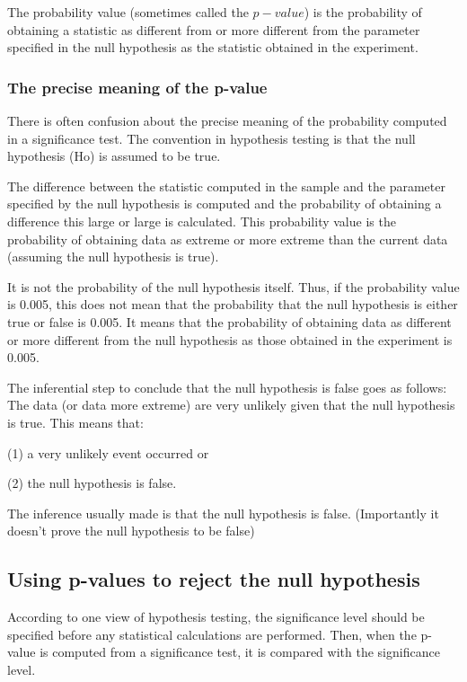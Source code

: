 \documentclass[a4paper,12pt]{article}
\begin{document}
The probability value (sometimes called the $p-value$) is the probability of obtaining a statistic as different from or more different from the parameter specified in the null hypothesis as the statistic obtained in the experiment.

\subsubsection{The precise meaning of the p-value}

There is often confusion about the precise meaning of the probability computed in a significance test. The convention in hypothesis testing is that the null hypothesis (Ho) is assumed to be true.

The difference between the statistic computed in the sample and the parameter specified by the null hypothesis is computed and the probability of obtaining a difference this large or large is calculated. This probability value is the probability of obtaining data as extreme or more extreme than the current data (assuming the null hypothesis is true).

It is not the probability of the null hypothesis itself. Thus, if the probability value is 0.005, this does not mean that the probability that the null hypothesis is either true or false is 0.005. It means that the probability of obtaining data as different or more different from the null hypothesis as those obtained in the experiment is 0.005.

The inferential step to conclude that the null hypothesis is false goes as follows: The data (or data more extreme) are very unlikely given that the null hypothesis is true.
This means that:

(1) a very unlikely event occurred or

(2) the null hypothesis is false.

The inference usually made is that the null hypothesis is false.  (Importantly it doesn't prove the null hypothesis to be false)

\subsection{Using p-values to reject the null hypothesis}
According to one view of hypothesis testing, the significance level should be specified before any statistical calculations are performed. Then, when the p-value is computed from a significance test, it is compared with the significance level.
\end{document}
